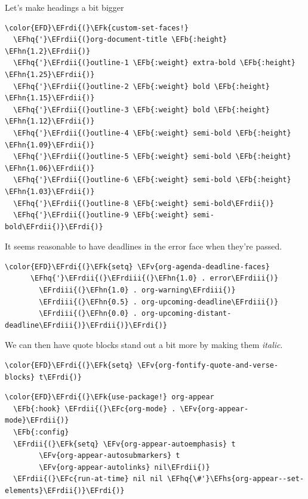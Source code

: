 \documentclass{scrartcl}
\newcommand{\EFk}[1]{\textcolor{EFk}{#1}} %
\newcommand{\EFb}[1]{\textcolor{EFb}{#1}} %
\newcommand{\EFc}[1]{\textcolor{EFc}{#1}} %
\newcommand{\EFv}[1]{\textcolor{EFv}{#1}} %
\newcommand{\EFhn}[1]{\textcolor{EFhn}{\textbf{#1}}} %
\newcommand{\EFhq}[1]{\textcolor{EFhq}{#1}} %
\newcommand{\EFhs}[1]{\textcolor{EFhs}{#1}} %
\newcommand{\EFrdi}[1]{\textcolor{EFrdi}{#1}} %
\newcommand{\EFrdii}[1]{\textcolor{EFrdii}{#1}} %
\newcommand{\EFrdiii}[1]{\textcolor{EFrdiii}{#1}} %
\begin{document}
Let's make headings a bit bigger
\begin{Code}
\begin{Verbatim}[]
\color{EFD}\EFrdi{(}\EFk{custom-set-faces!}
  \EFhq{'}\EFrdii{(}org-document-title \EFb{:height} \EFhn{1.2}\EFrdii{)}
  \EFhq{'}\EFrdii{(}outline-1 \EFb{:weight} extra-bold \EFb{:height} \EFhn{1.25}\EFrdii{)}
  \EFhq{'}\EFrdii{(}outline-2 \EFb{:weight} bold \EFb{:height} \EFhn{1.15}\EFrdii{)}
  \EFhq{'}\EFrdii{(}outline-3 \EFb{:weight} bold \EFb{:height} \EFhn{1.12}\EFrdii{)}
  \EFhq{'}\EFrdii{(}outline-4 \EFb{:weight} semi-bold \EFb{:height} \EFhn{1.09}\EFrdii{)}
  \EFhq{'}\EFrdii{(}outline-5 \EFb{:weight} semi-bold \EFb{:height} \EFhn{1.06}\EFrdii{)}
  \EFhq{'}\EFrdii{(}outline-6 \EFb{:weight} semi-bold \EFb{:height} \EFhn{1.03}\EFrdii{)}
  \EFhq{'}\EFrdii{(}outline-8 \EFb{:weight} semi-bold\EFrdii{)}
  \EFhq{'}\EFrdii{(}outline-9 \EFb{:weight} semi-bold\EFrdii{)}\EFrdi{)}
\end{Verbatim}
\end{Code}

It seems reasonable to have deadlines in the error face when they're passed.
\begin{Code}
\begin{Verbatim}[]
\color{EFD}\EFrdi{(}\EFk{setq} \EFv{org-agenda-deadline-faces}
      \EFhq{'}\EFrdii{(}\EFrdiii{(}\EFhn{1.0} . error\EFrdiii{)}
        \EFrdiii{(}\EFhn{1.0} . org-warning\EFrdiii{)}
        \EFrdiii{(}\EFhn{0.5} . org-upcoming-deadline\EFrdiii{)}
        \EFrdiii{(}\EFhn{0.0} . org-upcoming-distant-deadline\EFrdiii{)}\EFrdii{)}\EFrdi{)}
\end{Verbatim}
\end{Code}

We can then have quote blocks stand out a bit more by making them \emph{italic}.
\begin{Code}
\begin{Verbatim}[]
\color{EFD}\EFrdi{(}\EFk{setq} \EFv{org-fontify-quote-and-verse-blocks} t\EFrdi{)}
\end{Verbatim}
\end{Code}

\begin{Code}
\begin{Verbatim}[]
\color{EFD}\EFrdi{(}\EFk{use-package!} org-appear
  \EFb{:hook} \EFrdii{(}\EFc{org-mode} . \EFv{org-appear-mode}\EFrdii{)}
  \EFb{:config}
  \EFrdii{(}\EFk{setq} \EFv{org-appear-autoemphasis} t
        \EFv{org-appear-autosubmarkers} t
        \EFv{org-appear-autolinks} nil\EFrdii{)}
  \EFrdii{(}\EFc{run-at-time} nil nil \EFhq{\#'}\EFhs{org-appear--set-elements}\EFrdii{)}\EFrdi{)}
\end{Verbatim}
\end{Code}
\end{document}
